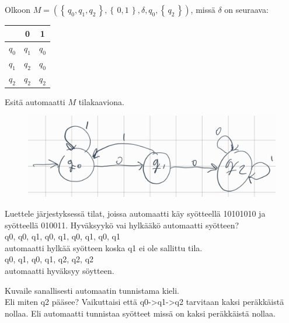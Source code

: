\documentclass[12pt,a4paper]{article}
\newcommand{\set}[1]{\left\{\,#1\,\right\}}
\begin{document}
Olkoon $M=(\set{q_0,q_1,q_2},\set{0,1},\delta,q_0,\set{q_2})$,
missä $\delta$ on seuraava:
\begin{center}
\begin{tabular}{c|cc}
& 0 & 1\\\hline
$q_0$ & $q_1$ & $q_0$\\
$q_1$ & $q_2$ & $q_0$\\
$q_2$ & $q_2$ & $q_2$
\end{tabular}
\end{center}
\begin{kohta}
\item Esitä automaatti $M$ tilakaaviona.
\begin{figure}[h]
  \centering
  \includegraphics[width=.8\textwidth]{viikko2tehtävä4.jpg}
\end{figure}
\item Luettele järjestyksessä tilat, joissa automaatti käy syötteellä 10101010 ja syötteellä 010011. Hyväksyykö vai hylkääkö automaatti syötteen?\\

q0, q0, q1, q0, q1, q0, q1, q0, q1\\

automaatti hylkää syötteen koska q1 ei ole sallittu tila.\\

q0, q1, q0, q1, q2, q2, q2\\

automaatti hyväksyy söytteen.

\item Kuvaile sanallisesti automaatin tunnistama kieli.\\

Eli miten q2 pääsee? Vaikuttaisi että q0->q1->q2 tarvitaan
kaksi peräkkäistä nollaa. Eli automaatti tunnistaa syötteet missä on
kaksi peräkkäistä nollaa.

\end{kohta}
\end{document}
